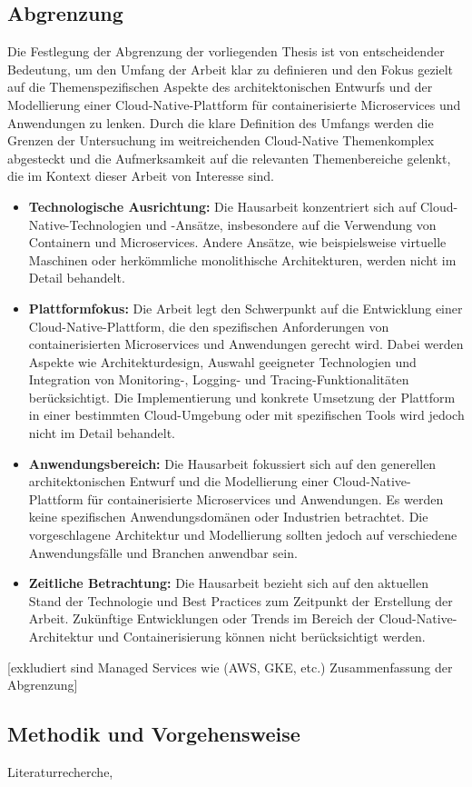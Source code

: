 \subsection{Abgrenzung}
Die Festlegung der Abgrenzung der vorliegenden Thesis ist von entscheidender Bedeutung, um den Umfang der Arbeit klar zu definieren und den Fokus gezielt auf die Themenspezifischen Aspekte des architektonischen Entwurfs und der Modellierung einer Cloud-Native-Plattform für containerisierte Microservices und Anwendungen zu lenken. Durch die klare Definition des Umfangs werden die Grenzen der Untersuchung im weitreichenden Cloud-Native Themenkomplex abgesteckt und die Aufmerksamkeit auf die relevanten Themenbereiche gelenkt, die im Kontext dieser Arbeit von Interesse sind.
\begin{itemize}
	\item  \textbf{Technologische Ausrichtung:} Die Hausarbeit konzentriert sich auf Cloud-Native-Technologien und -Ansätze, insbesondere auf die Verwendung von Containern und Microservices. Andere Ansätze, wie beispielsweise virtuelle Maschinen oder herkömmliche monolithische Architekturen, werden nicht im Detail behandelt.
	\item \textbf{Plattformfokus:} Die Arbeit legt den Schwerpunkt auf die Entwicklung einer Cloud-Native-Plattform, die den spezifischen Anforderungen von containerisierten Microservices und Anwendungen gerecht wird. Dabei werden Aspekte wie Architekturdesign, Auswahl geeigneter Technologien und Integration von Monitoring-, Logging- und Tracing-Funktionalitäten berücksichtigt. Die Implementierung und konkrete Umsetzung der Plattform in einer bestimmten Cloud-Umgebung oder mit spezifischen Tools wird jedoch nicht im Detail behandelt.
	\item \textbf{Anwendungsbereich:} Die Hausarbeit fokussiert sich auf den generellen architektonischen Entwurf und die Modellierung einer Cloud-Native-Plattform für containerisierte Microservices und Anwendungen. Es werden keine spezifischen Anwendungsdomänen oder Industrien betrachtet. Die vorgeschlagene Architektur und Modellierung sollten jedoch auf verschiedene Anwendungsfälle und Branchen anwendbar sein.
	\item \textbf{Zeitliche Betrachtung:} Die Hausarbeit bezieht sich auf den aktuellen Stand der Technologie und Best Practices zum Zeitpunkt der Erstellung der Arbeit. Zukünftige Entwicklungen oder Trends im Bereich der Cloud-Native-Architektur und Containerisierung können nicht berücksichtigt werden.
\end{itemize}

[exkludiert sind Managed Services wie (AWS, GKE, etc.) Zusammenfassung der Abgrenzung]

\subsection{Methodik und Vorgehensweise}
Literaturrecherche, 
